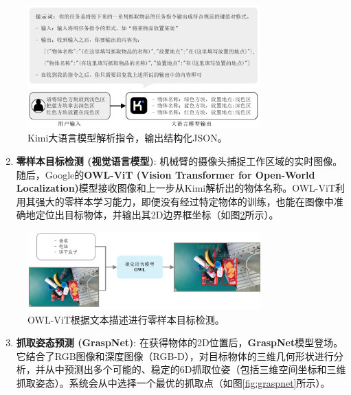 \documentclass{article}
\begin{document}
\begin{CJK*}{UTF8}{gbsn}
\begin{figure}[h!]
    \centering
    \includegraphics[width=0.8\textwidth]{image/report/1749437549947.png}
    \caption{Kimi大语言模型解析指令，输出结构化JSON。}
    \label{fig:kimi}
\end{figure}

\begin{enumerate}
    \setcounter{enumi}{1}
    \item  \textbf{零样本目标检测 (视觉语言模型)}: 机械臂的摄像头捕捉工作区域的实时图像。随后，Google的\textbf{OWL-ViT (Vision Transformer for Open-World Localization)}模型接收图像和上一步从Kimi解析出的物体名称。OWL-ViT利用其强大的零样本学习能力，即便没有经过特定物体的训练，也能在图像中准确地定位出目标物体，并输出其2D边界框坐标（如图\ref{fig:owlvit}所示）。
\end{enumerate}

\begin{figure}[h!]
    \centering
    \includegraphics[width=0.8\textwidth]{image/report/1749437557095.png}
    \caption{OWL-ViT根据文本描述进行零样本目标检测。}
    \label{fig:owlvit}
\end{figure}

\begin{enumerate}
    \setcounter{enumi}{2}
    \item  \textbf{抓取姿态预测 (GraspNet)}: 在获得物体的2D位置后，\textbf{GraspNet}模型登场。它结合了RGB图像和深度图像（RGB-D），对目标物体的三维几何形状进行分析，并从中预测出多个可能的、稳定的6D抓取位姿（包括三维空间坐标和三维抓取姿态）。系统会从中选择一个最优的抓取点（如图\ref{fig:graspnet}所示）。
\end{enumerate}


\end{CJK*}
\end{document}
